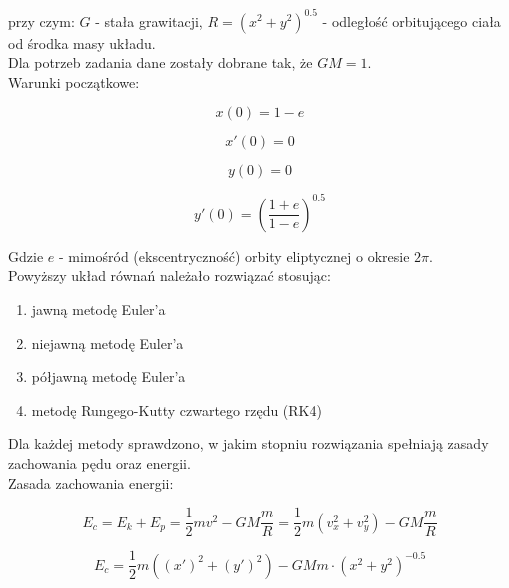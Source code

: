 \documentclass{article}
\begin{document}
	przy czym: $G$ - stała grawitacji, $R = (x^2+y^2)^{0.5}$ - odległość orbitującego ciała od środka masy układu. 
	\\

	Dla potrzeb zadania dane zostały dobrane tak, że $GM = 1$. 
	\\

	Warunki początkowe:

	\begin{equation}
		x(0) = 1-e
	\end{equation}

	\begin{equation}
		x'(0) = 0
	\end{equation}

	\begin{equation}
		y(0) = 0
	\end{equation}

	\begin{equation}
		y'(0) = \left( \frac{1+e}{1-e} \right)  ^ {0.5}
	\end{equation}

	Gdzie $e$ - mimośród (ekscentryczność) orbity eliptycznej o okresie $2\pi$.
	\\



	Powyższy układ równań należało rozwiązać stosując:

	\begin{enumerate}
		\item jawną metodę Euler'a
		\item niejawną metodę Euler'a
		\item półjawną metodę Euler'a
		\item metodę Rungego-Kutty czwartego rzędu (RK4)
	\end{enumerate}

	Dla każdej metody sprawdzono, w jakim stopniu rozwiązania spełniają zasady zachowania pędu oraz energii.
	\\

	Zasada zachowania energii:

	\begin{equation}
		E_c = E_k+E_p = \frac{1}{2} m v^2 - GM \frac{m}{R} = \frac{1}{2} m (v_x^2+v_y^2) - GM \frac{m}{R}
	\end{equation}

	\begin{equation}
		E_c = \frac{1}{2} m ((x')^2 + (y')^2) - GMm \cdot (x^2+y^2)^{-0.5}
	\end{equation}
\end{document}
